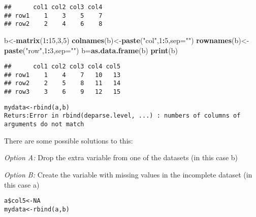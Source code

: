 \documentclass[]{book}
\newenvironment{Shaded}{\begin{snugshade}}{\end{snugshade}}
\newcommand{\KeywordTok}[1]{\textcolor[rgb]{0.13,0.29,0.53}{\textbf{#1}}}
\newcommand{\DataTypeTok}[1]{\textcolor[rgb]{0.13,0.29,0.53}{#1}}
\newcommand{\DecValTok}[1]{\textcolor[rgb]{0.00,0.00,0.81}{#1}}
\newcommand{\StringTok}[1]{\textcolor[rgb]{0.31,0.60,0.02}{#1}}
\newcommand{\OtherTok}[1]{\textcolor[rgb]{0.56,0.35,0.01}{#1}}
\newcommand{\OperatorTok}[1]{\textcolor[rgb]{0.81,0.36,0.00}{\textbf{#1}}}
\newcommand{\NormalTok}[1]{#1}
\theoremstyle{definition}
\theoremstyle{definition}
\theoremstyle{definition}
\theoremstyle{remark}
\begin{document}
\begin{verbatim}
##      col1 col2 col3 col4
## row1    1    3    5    7
## row2    2    4    6    8
\end{verbatim}

\begin{Shaded}
\begin{Highlighting}[]
\NormalTok{b<-}\KeywordTok{matrix}\NormalTok{(}\DecValTok{1}\OperatorTok{:}\DecValTok{15}\NormalTok{,}\DecValTok{3}\NormalTok{,}\DecValTok{5}\NormalTok{)}
\KeywordTok{colnames}\NormalTok{(b)<-}\KeywordTok{paste}\NormalTok{(}\StringTok{"col"}\NormalTok{,}\DecValTok{1}\OperatorTok{:}\DecValTok{5}\NormalTok{,}\DataTypeTok{sep=}\StringTok{""}\NormalTok{)}
\KeywordTok{rownames}\NormalTok{(b)<-}\KeywordTok{paste}\NormalTok{(}\StringTok{"row"}\NormalTok{,}\DecValTok{1}\OperatorTok{:}\DecValTok{3}\NormalTok{,}\DataTypeTok{sep=}\StringTok{""}\NormalTok{)}
\NormalTok{b=}\KeywordTok{as.data.frame}\NormalTok{(b)}
\KeywordTok{print}\NormalTok{(b)}
\end{Highlighting}
\end{Shaded}

\begin{verbatim}
##      col1 col2 col3 col4 col5
## row1    1    4    7   10   13
## row2    2    5    8   11   14
## row3    3    6    9   12   15
\end{verbatim}

\begin{verbatim}
mydata<-rbind(a,b)
Returs:Error in rbind(deparse.level, ...) : numbers of columns of arguments do not match
\end{verbatim}

There are some possible solutions to this:

\emph{Option A:} Drop the extra variable from one of the datasets (in
this case b)

\begin{Shaded}
\end{Shaded}

\emph{Option B:} Create the variable with missing values in the
incomplete dataset (in this case a)

\begin{verbatim}
a$col5<-NA
mydata<-rbind(a,b)
\end{verbatim}
\end{document}
